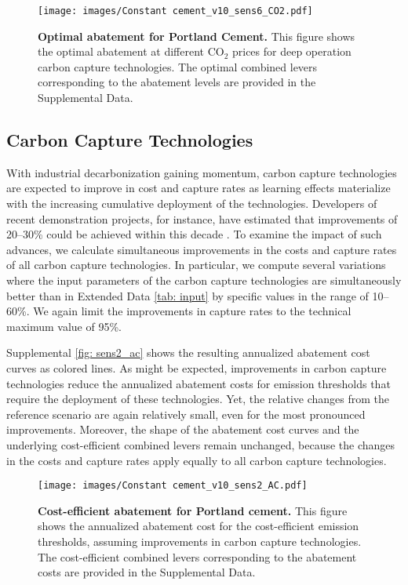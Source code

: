 \documentclass[12pt, a4paper]{article} %
\newcommand{\Suppl}{Supplemental}
\begin{document}
\begin{figure}[ht]
\centering
\texttt{[image: images/Constant cement\_v10\_sens6\_CO2.pdf]}
\caption{\textbf{Optimal abatement for Portland Cement.} This figure shows the optimal abatement at different CO$_2$ prices for deep operation carbon capture technologies. The optimal combined levers corresponding to the abatement levels are provided in the \Suppl$ $ Data.}
\label{fig: sens6_value}
\end{figure}

\subsection{Carbon Capture Technologies}
\label{sec: sn-ccs}

With industrial decarbonization gaining momentum, carbon capture technologies are expected to improve in cost and capture rates as learning effects materialize with the increasing cumulative deployment of the technologies. Developers of recent demonstration projects, for instance, have estimated that improvements of 20--30\% could be achieved within this decade \citep{kearns2021technology}. To examine the impact of such advances, we calculate simultaneous improvements in the costs and capture rates of all carbon capture technologies. In particular, we compute several variations where the input parameters of the carbon capture technologies are simultaneously better than in Extended Data \autoref{tab: input} by specific values in the range of 10--60\%. We again limit the improvements in capture rates to the technical maximum value of 95\%.

\Suppl$ $ \autoref{fig: sens2_ac} shows the resulting annualized abatement cost curves as colored lines. As might be expected, improvements in carbon capture technologies reduce the annualized abatement costs for emission thresholds that require the deployment of these technologies. Yet, the relative changes from the reference scenario are again relatively small, even for the most pronounced improvements. Moreover, the shape of the abatement cost curves and the underlying cost-efficient combined levers remain unchanged, because the changes in the costs and capture rates apply equally to all carbon capture technologies.

\begin{figure}[ht]
\centering
\texttt{[image: images/Constant cement\_v10\_sens2\_AC.pdf]}
\caption{\textbf{Cost-efficient abatement for Portland cement.} This figure shows the annualized abatement cost for the cost-efficient emission thresholds, assuming improvements in carbon capture technologies. The cost-efficient combined levers corresponding to the abatement costs are provided in the \Suppl$ $ Data.}
\label{fig: sens2_ac}
\end{figure}
\end{document}
